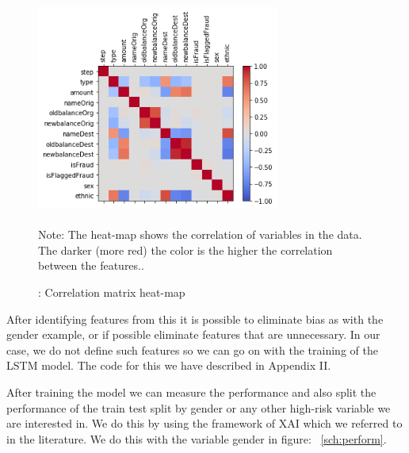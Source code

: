 \documentclass[jou,apacite]{apa6}
\begin{document}
\begin{figure}[htb!]
  \includegraphics[width=8cm, height=7cm]{correlation.png}
  \caption{: Correlation matrix heat-map}
    \medskip %
        \begin{minipage}{0.45\textwidth} %
        {\footnotesize Note: The heat-map shows the correlation of variables in the data. The darker (more red) the color is the higher the correlation between the features..\par}
        \end{minipage}
  \label{sch:corre}
\end{figure}

After identifying features from this it is possible to eliminate bias as with the gender example, or if possible eliminate features that are unnecessary. In our case, we do not define such features so we can go on with the training of the LSTM model. The code for this we have described in Appendix II.\par

After training the model we can measure the performance and also split the performance of the train test split by gender or any other high-risk variable we are interested in. We do this by using the framework of XAI which we referred to in the literature. We do this with the variable gender in figure: ~\ref{sch:perform}.
\end{document}
